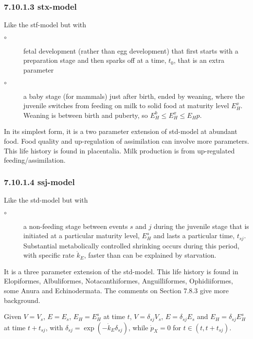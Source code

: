 \subsubsection*{7.10.1.3 stx-model}
{}
\label{sec_c:stx}

Like the stf-model  but with 
\begin{description}
  \item[$\circ$] fetal development (rather than egg development) that first starts with a preparation stage and then sparks off at a time, 
	  $t_0$, that is an extra parameter 
	
  \item[$\circ$] a baby stage (for mammals) just after birth, ended by weaning, where the juvenile switches from feeding on milk to solid food 
	  at maturity level $E_H^x$.
    Weaning is between birth and puberty, so $E_H^b \le E_H^x \le E_Hp$.  
\end{description}
In its simplest form, it is a two parameter extension of std-model at abundant food.
Food quality and up-regulation of assimilation can involve more parameters.
This life history is found in placentalia.
Milk production is from up-regulated feeding/assimilation.

\subsubsection*{7.10.1.4 ssj-model}
{}
\label{sec_c:ssj}

Like the std-model but with 
\begin{description}
   \item[$\circ$] a non-feeding stage between events $s$ and $j$ during the juvenile stage 
	    that is initiated at a particular maturity level, $E_H^s$ and lasts a particular time, $t_{sj}$.
      Substantial metabolically controlled shrinking occurs during this period, with specific rate $\dot{k}_E$, 
			faster than can be explained by starvation.  
\end{description}
It is a three parameter extension of the std-model.
This life history is found in Elopiformes, Albuliformes, Notacanthiformes, Anguilliformes, Ophidiiformes, some Anura and Echinodermata.
The comments on Section 7.8.3 give more background.

Given $V = V_s$, $E = E_s$, $E_H = E_H^s$ at time $t$, $V = \delta_{sj} V_s$, $E = \delta_{sj} E_s$ and $E_H = \delta_{sj} E_H^s$ 
  at time $t + t_{sj}$, with $\delta_{sj} = \exp(- \dot{k}_E \delta_{sj})$, while $\dot{p}_X = 0$ for $t \in (t, t + t_{sj})$.
 

